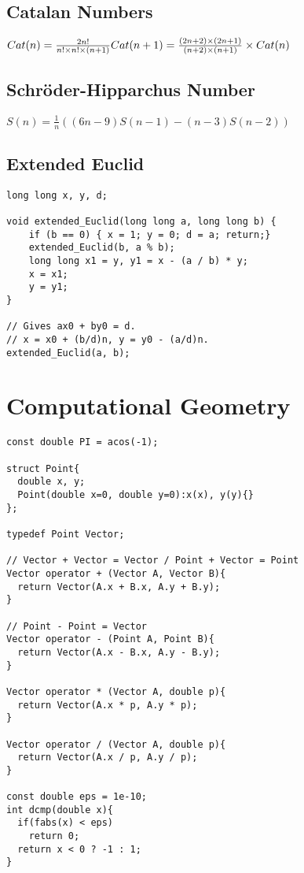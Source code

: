 \documentclass[10pt,landscape]{article}
\begin{document}
\begin{multicols}{2}
\subsection{Catalan Numbers}
\(Cat(n) = \frac{2n!}{n!\times n! \times (n + 1)} \\ 
Cat(n + 1) = \frac{(2n + 2) \times (2n + 1)}{(n + 2) \times (n + 1)}
\times Cat(n) \)

\subsection{Schr\"oder-Hipparchus Number}
\(S(n) = \frac{1}{n}((6n - 9)S(n - 1) - (n - 3)S(n - 2)) \)

\subsection{Extended Euclid}
\begin{lstlisting}
long long x, y, d;

void extended_Euclid(long long a, long long b) {
    if (b == 0) { x = 1; y = 0; d = a; return;}
    extended_Euclid(b, a % b);
    long long x1 = y, y1 = x - (a / b) * y;
    x = x1;
    y = y1;
}

// Gives ax0 + by0 = d.
// x = x0 + (b/d)n, y = y0 - (a/d)n.
extended_Euclid(a, b);

\end{lstlisting}
\newpage

\section{Computational Geometry}
\begin{lstlisting}
const double PI = acos(-1);

struct Point{
  double x, y;
  Point(double x=0, double y=0):x(x), y(y){}
};

typedef Point Vector;

// Vector + Vector = Vector / Point + Vector = Point
Vector operator + (Vector A, Vector B){
  return Vector(A.x + B.x, A.y + B.y);
}

// Point - Point = Vector
Vector operator - (Point A, Point B){
  return Vector(A.x - B.x, A.y - B.y);
}

Vector operator * (Vector A, double p){
  return Vector(A.x * p, A.y * p);
}

Vector operator / (Vector A, double p){
  return Vector(A.x / p, A.y / p);
}

const double eps = 1e-10;
int dcmp(double x){
  if(fabs(x) < eps)
    return 0;
  return x < 0 ? -1 : 1;
}


\end{lstlisting}
\end{multicols}
\end{document}
